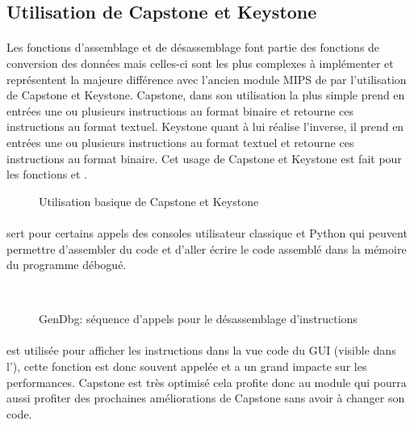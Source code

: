 \documentclass[11pt, book, english, french, standardlists]{upmethodology-document}
\begin{document}
			\subsection{Utilisation de Capstone et Keystone}
				\paragraph*{}
					Les fonctions d'assemblage et de désassemblage font partie des fonctions de conversion des données mais celles-ci sont les plus complexes à implémenter et représentent la majeure différence avec l'ancien module MIPS de par l'utilisation de Capstone et Keystone.
					Capstone, dans son utilisation la plus simple prend en entrées une ou plusieurs instructions au format binaire et retourne ces instructions au format textuel. Keystone quant à lui réalise l'inverse, il prend en entrées une ou plusieurs instructions au format textuel et retourne ces instructions au format binaire. Cet usage de Capstone et Keystone est fait pour les fonctions  et .
				\begin{figure}[H]
					\centering
					\caption{Utilisation basique de Capstone et Keystone}
					\label{fig:Capstone_Keystone_utilisation_basique}
				\end{figure}
				\paragraph*{}
					 sert pour certains appels des consoles utilisateur classique et Python qui peuvent permettre d'assembler du code et d'aller écrire le code assemblé dans la mémoire du programme débogué.
				\begin{figure}[H]
					\centering
					\\
					\vspace{5pt}
					\caption{GenDbg: séquence d'appels pour le désassemblage d'instructions}
					\label{fig:GenDbg_sequence_UnassembleBloc}
				\end{figure}
				\paragraph*{}
					 est utilisée pour afficher les instructions dans la vue code du GUI (visible dans l'), cette fonction est donc souvent appelée et a un grand impacte sur les performances. Capstone est très optimisé cela profite donc au module qui pourra aussi profiter des prochaines améliorations de Capstone sans avoir à changer son code.
\end{document}
